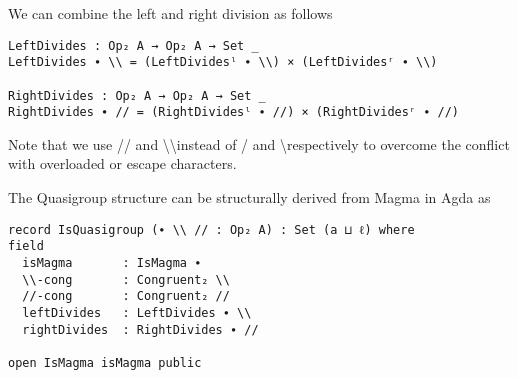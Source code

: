 We can combine the left and right division as follows

\begin{verbatim}
LeftDivides : Op₂ A → Op₂ A → Set _
LeftDivides ∙ \\ = (LeftDividesˡ ∙ \\) × (LeftDividesʳ ∙ \\)

RightDivides : Op₂ A → Op₂ A → Set _
RightDivides ∙ // = (RightDividesˡ ∙ //) × (RightDividesʳ ∙ //)
\end{verbatim}

Note that we use // and \textbackslash\textbackslash instead of / and
\textbackslash respectively to overcome the conflict with overloaded or escape
characters. 

The Quasigroup structure can be structurally derived from Magma in Agda as 

\begin{verbatim}
record IsQuasigroup (∙ \\ // : Op₂ A) : Set (a ⊔ ℓ) where
field
  isMagma       : IsMagma ∙
  \\-cong       : Congruent₂ \\
  //-cong       : Congruent₂ //
  leftDivides   : LeftDivides ∙ \\
  rightDivides  : RightDivides ∙ //

open IsMagma isMagma public
\end{verbatim}
\begin{comment}
  \textbackslash\textbackslash-cong\textsuperscript{l} : LeftCongruent \textbackslash\textbackslash
  \textbackslash\textbackslash-cong\textsuperscript{l} y≈z = \textbackslash\textbackslash-cong refl y≈z

  \textbackslash\textbackslash-cong\textsuperscript{r} : RightCongruent \textbackslash\textbackslash
  \textbackslash\textbackslash-cong\textsuperscript{r} y≈z = \textbackslash\textbackslash-cong y≈z refl

  //-cong\textsuperscript{l} : LeftCongruent //
  //-cong\textsuperscript{l} y≈z = //-cong refl y≈z

  //-cong\textsuperscript{r} : RightCongruent //
  //-cong\textsuperscript{r} y≈z = //-cong y≈z refl

  leftDivides\textsuperscript{l} : LeftDivides\textsuperscript{l} ∙ \textbackslash\textbackslash
  leftDivides\textsuperscript{l} = proj\textsubscript{1} leftDivides

  leftDivides\textsuperscript{r} : LeftDivides\textsuperscript{r} ∙ \textbackslash\textbackslash
  leftDivides\textsuperscript{r} = proj\textsubscript{2} leftDivides

  rightDivides\textsuperscript{l} : RightDivides\textsuperscript{l} ∙ //
  rightDivides\textsuperscript{l} = proj\textsubscript{1} rightDivides

  rightDivides\textsuperscript{r} : RightDivides\textsuperscript{r} ∙ //
  rightDivides\textsuperscript{r} = proj\textsubscript{2} rightDivides
\end{comment}

